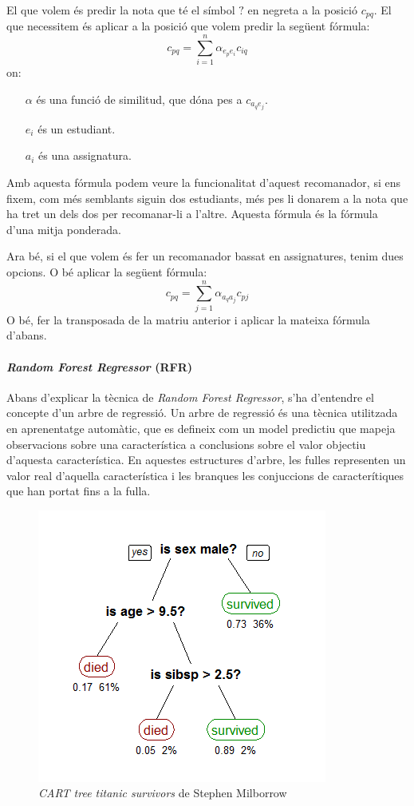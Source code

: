 \documentclass[12pt,a4paper,catalan]{article}
\begin{document}
El que volem és predir la nota que té el símbol $?$ en negreta a la posició $c_{pq}$. El que necessitem és aplicar a la posició que volem predir la següent fórmula:
$$
	c_{pq} = \sum_{i=1}^n{\alpha_{e_pe_i}c_{iq}}
$$
on:
\begin{itemize}[leftmargin=.5in]
	\item [$\alpha$] és una funció de similitud, que dóna pes a $c_{a_qe_j}$.
	\item [$e_i$] és un estudiant.
	\item [$a_i$] és una assignatura.
\end{itemize}

Amb aquesta fórmula podem veure la funcionalitat d'aquest recomanador, si ens fixem, com més semblants siguin dos estudiants, més pes li donarem a la nota que ha tret un dels dos per recomanar-li a l'altre. Aquesta fórmula és la fórmula d'una mitja ponderada.

\newpage

Ara bé, si el que volem és fer un recomanador bassat en assignatures, tenim dues opcions. O bé aplicar la següent fórmula:
$$
	c_{pq} = \sum_{j=1}^n{\alpha_{a_qa_j}c_{pj}}
$$
O bé, fer la transposada de la matriu anterior i aplicar la mateixa fórmula d'abans.

\paragraph{\textit{Random Forest Regressor} (RFR)}
Abans d'explicar la tècnica de \textit{Random Forest Regressor}, s'ha d'entendre el concepte d'un arbre de regressió. Un arbre de regressió és una tècnica utilitzada en aprenentatge automàtic, que es defineix com un model predictiu que mapeja observacions sobre una característica a conclusions sobre el valor objectiu d'aquesta característica. En aquestes estructures d'arbre, les fulles representen un valor real d'aquella característica i les branques les conjuccions de caracterítiques que han portat fins a la fulla.

\begin{figure}[h]
\centering
\includegraphics[width=.5\linewidth]{img/randomforest.png}
\caption{\textit{CART tree titanic survivors} de Stephen Milborrow}
\end{figure}
\end{document}
